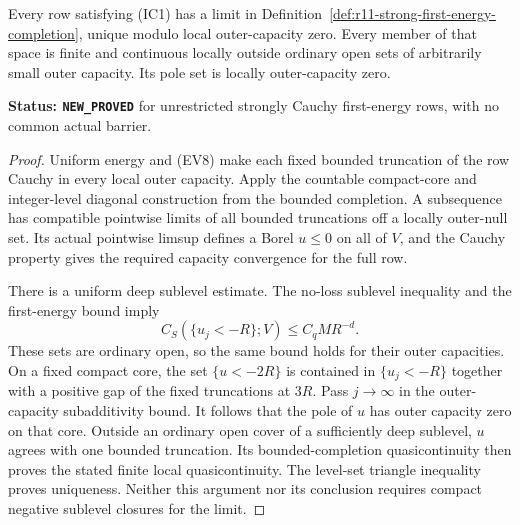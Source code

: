 \begin{proposition}
\label{prop:r11-strong-cauchy-borel-limit}
Every row satisfying (IC1) has a limit in
Definition~\ref{def:r11-strong-first-energy-completion}, unique
modulo local outer-capacity zero. Every member of that space is
finite and continuous locally outside ordinary open sets of
arbitrarily small outer capacity. Its pole set is locally
outer-capacity zero.
\end{proposition}

\noindent\textbf{Status: \texttt{NEW\_PROVED}} for unrestricted
strongly Cauchy first-energy rows, with no common actual barrier.

\begin{proof}
Uniform energy and (EV8) make each fixed bounded truncation
of the row Cauchy in every local outer capacity. Apply the
countable compact-core and integer-level diagonal construction
from the bounded completion. A subsequence has compatible
pointwise limits of all bounded truncations off a locally
outer-null set. Its actual pointwise limsup defines a Borel
$u\leq0$ on all of $V$, and the Cauchy property gives the
required capacity convergence for the full row.

There is a uniform deep sublevel estimate. The no-loss
sublevel inequality and the first-energy bound imply
\[
            C_S(\{u_j<-R\};V)\leq C_q M R^{-d}.
 \tag{IC9}
\]
These sets are ordinary open, so the same bound holds for
their outer capacities. On a fixed compact core, the set
$\{u<-2R\}$ is contained in $\{u_j<-R\}$ together with
a positive gap of the fixed truncations at $3R$.
Pass $j\to\infty$ in the outer-capacity subadditivity bound.
It follows that the pole of $u$ has outer capacity zero on
that core. Outside an ordinary open cover of a sufficiently
deep sublevel, $u$ agrees with one bounded truncation.
Its bounded-completion quasicontinuity then proves the stated
finite local quasicontinuity. The level-set triangle inequality
proves uniqueness. Neither this argument nor its conclusion
requires compact negative sublevel closures for the limit.
\end{proof}

